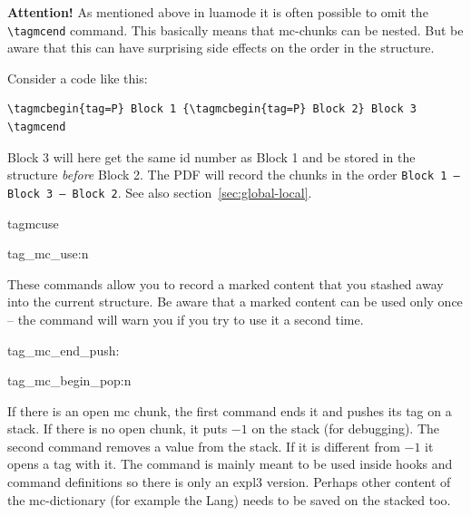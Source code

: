 \documentclass[DIV=12,parskip=half-,bibliography=totoc]{scrartcl}
\newcommand\PDF{PDF}
\begin{document}
\begin{tcolorbox}[before upper=\tagpdfparaOn]
\label{mc-nesting}

\textbf{Attention!} As mentioned above in luamode it is often possible to omit the \verb+\tagmcend+ command. This basically means that mc-chunks can be nested.  But be aware that this can have surprising side effects on the order in the structure.

Consider a code like this:


\begin{lstlisting}
\tagmcbegin{tag=P} Block 1 {\tagmcbegin{tag=P} Block 2} Block 3 \tagmcend
\end{lstlisting}


Block 3 will here get the same id number as Block 1 and be stored in the structure \emph{before} Block 2. The \PDF{} will record the chunks in the order \texttt{Block 1 -- Block 3 -- Block 2}. See also section~\ref{sec:global-local}.

\end{tcolorbox}


\begin{docCommand}{tagmcuse}{}\end{docCommand}
\begin{docCommand}{tag_mc_use:n}{}\end{docCommand}


These commands allow you to record a marked content that you stashed away into the current structure. Be aware that a marked content can be used only once -- the command will warn you if you try to use it a second time.


\begin{docCommand}{tag_mc_end_push:}{}\end{docCommand}
\begin{docCommand}{tag_mc_begin_pop:n}{}\end{docCommand}

If there is an open mc chunk,
the first command ends it and pushes its tag on a stack. If there is no
open chunk, it puts $-1$ on the stack (for debugging).
The second command removes a value from the stack. If it is different from
$-1$ it opens a tag with it. The command is mainly meant to be used inside hooks and command
definitions so there is only an expl3 version. Perhaps other content of the mc-dictionary (for example the Lang) needs to be saved on the stacked too.
\end{document}
